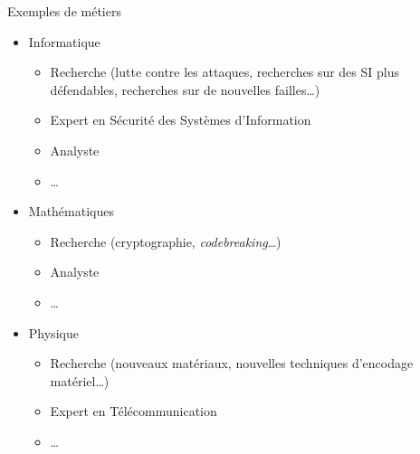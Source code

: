\documentclass{beamer}
\begin{document}
\begin{frame}{Exemples de métiers}
    
    \begin{itemize}
        \item Informatique \begin{itemize}
            \item Recherche (lutte contre les attaques, recherches sur des SI plus défendables, recherches sur de nouvelles failles\dots)
            \item Expert en Sécurité des Systèmes d'Information
            \item Analyste
            \item \dots
        \end{itemize}
        \item Mathématiques \begin{itemize}
            \item Recherche (cryptographie, \emph{codebreaking}\dots)
            \item Analyste
            \item \dots
        \end{itemize}
        \item Physique \begin{itemize}
            \item Recherche (nouveaux matériaux, nouvelles techniques d'encodage matériel\dots)
            \item Expert en Télécommunication
            \item \dots
        \end{itemize}
    \end{itemize}
    
\end{frame}
\end{document}
